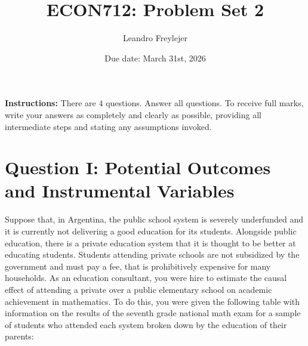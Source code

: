\documentclass[letterpaper,12pt]{article}
\title{\vspace{-.5in} ECON712: Problem Set 2}
\author{Leandro Freylejer}
\date{Due date: March 31st, 2026}
\begin{document}

\maketitle
\vspace{-.3in}
\textbf{Instructions:} There are $4$ questions. Answer all questions. To receive full marks, write your answers as completely and clearly as possible, providing all intermediate steps and stating any assumptions invoked.


\section*{Question I: Potential Outcomes and Instrumental Variables}
Suppose that, in Argentina, the public school system is severely underfunded and it is currently not delivering a good education for its students. Alongside public education, there is a private education system that it is thought to be better at educating students. Students attending private schools are not subsidized by the government and must pay a fee, that is prohibitively expensive for many households. As an education consultant, you were hire to estimate the causal effect of attending a private over a public elementary school on academic achievement in mathematics. To do this, you were given the following table with information on the results of the seventh grade national math exam for a sample of students who attended each system broken down by the education of their parents:      
\end{document}
